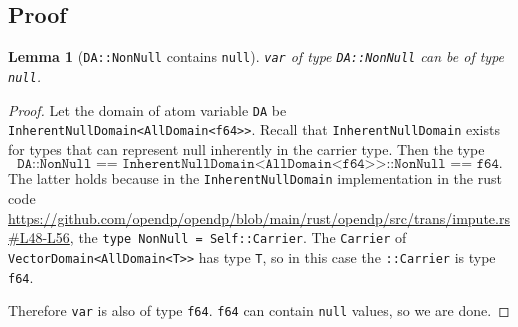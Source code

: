 \documentclass[11pt,a4paper]{article}
\newtheorem{lemma}[theorem]{Lemma}
\newcommand{\grace}[1]{{ {\color{purple}{(grace)~#1}}}}
\begin{document}
\subsection{Proof}
\grace{Mike's comments: If an instance of DA::NonNull is null, it is either imputed or a construction-time error is raised by 2.}
\begin{lemma}[\texttt{DA::NonNull} contains \texttt{null}] \label{lemma-NonNull}
\texttt{var} of type \texttt{DA::NonNull} can be of type \texttt{null}.
\end{lemma}
\begin{proof}
Let the domain of atom variable \texttt{DA} be \texttt{InherentNullDomain<AllDomain<f64>>}. Recall that \texttt{InherentNullDomain} exists for types that can represent null inherently in the carrier type. Then the type $$\texttt{DA::NonNull == InherentNullDomain<AllDomain<f64>>::NonNull == f64}.$$ The latter holds because in the \texttt{InherentNullDomain} implementation in the rust code \url{https://github.com/opendp/opendp/blob/main/rust/opendp/src/trans/impute.rs#L48-L56}, the \texttt{type NonNull = Self::Carrier}. The \texttt{Carrier} of \texttt{VectorDomain<AllDomain<T>>} has type \texttt{T}, so in this case the \texttt{::Carrier} is type \texttt{f64}.

Therefore \texttt{var} is also of type \texttt{f64}. \texttt{f64} can contain \texttt{null} values, so we are done.
\end{proof}
\end{document}

